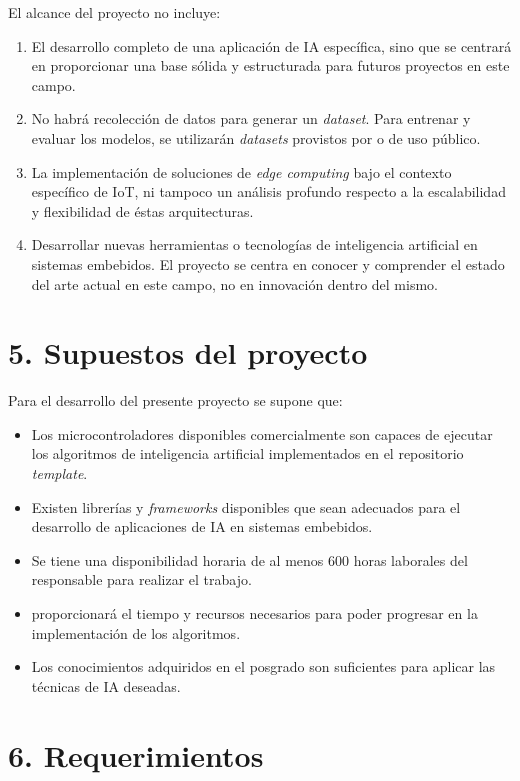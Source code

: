 \documentclass[
11pt, %
codirector, %
]{charter}
\begin{document}
El alcance del proyecto no incluye:
\begin{enumerate}
\item  El desarrollo completo de una aplicación de IA específica, sino que se centrará en proporcionar una base sólida y estructurada para futuros proyectos en este campo. 
\item No habrá recolección de datos para generar un \textit{dataset}. Para entrenar y evaluar los modelos, se utilizarán \textit{datasets} provistos por \empclientename o de uso público. 
\item La implementación de soluciones de \textit{edge computing} bajo el contexto específico de IoT, ni tampoco un análisis profundo respecto a la escalabilidad y flexibilidad de éstas arquitecturas. 
\item Desarrollar nuevas herramientas o tecnologías de inteligencia artificial en sistemas embebidos. El proyecto se centra en conocer y comprender el estado del arte actual en este campo, no en innovación dentro del mismo.
\end{enumerate}


\section{5. Supuestos del proyecto}
\label{sec:supuestos}
Para el desarrollo del presente proyecto se supone que: 
\begin{itemize}
	\item Los microcontroladores disponibles comercialmente son capaces de ejecutar los algoritmos de inteligencia artificial implementados en el repositorio \textit{template}.
	\item Existen librerías y \textit{frameworks} disponibles que sean adecuados para el desarrollo de aplicaciones de IA en sistemas embebidos.
	\item Se tiene una disponibilidad horaria de al menos 600 horas laborales del responsable para realizar el trabajo. 
	\item \empclientename proporcionará el tiempo y recursos necesarios para poder progresar en la implementación de los algoritmos.
	\item Los conocimientos adquiridos en el posgrado son suficientes para aplicar las técnicas de IA deseadas.
\end{itemize}


\section{6. Requerimientos}
\label{sec:requerimientos}
\end{document}
